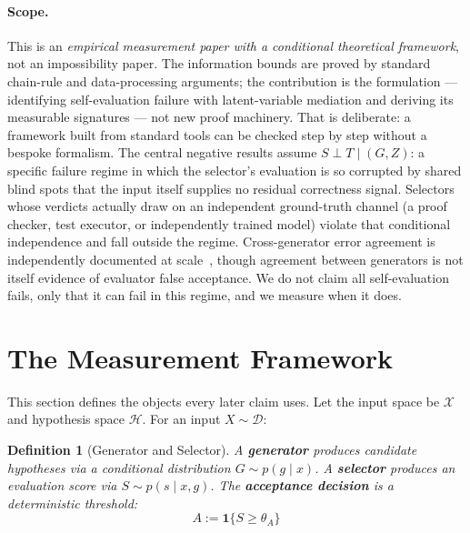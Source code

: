 \documentclass[a4paper,journal]{IAENGtran}
\newtheorem{Definition}[Theorem]{Definition}
\begin{document}
\paragraph{Scope.} This is an \emph{empirical measurement paper with a conditional
theoretical framework}, not an impossibility paper. The information bounds are
proved by standard chain-rule and data-processing arguments; the contribution is
the formulation — identifying self-evaluation failure with latent-variable
mediation and deriving its measurable signatures — not new proof machinery. That
is deliberate: a framework built from standard tools can be checked step by step
without a bespoke formalism. The central negative results assume $S\perp T\mid(G,Z)$: a specific failure regime in which the selector's evaluation
is so corrupted by shared blind spots that the input itself supplies no residual
correctness signal. Selectors whose verdicts actually draw on an independent ground-truth
channel (a proof checker,
test executor, or independently trained model) violate that conditional independence
and fall outside the regime. Cross-generator
error agreement is independently documented at scale~\cite{kim2025correlated}, though
agreement between generators is not itself evidence of evaluator false acceptance. We do
not claim all self-evaluation fails, only that it can fail in this regime, and we measure
when it does.

\section{The Measurement Framework}
\label{sec:formalization}

This section defines the objects every later claim uses. Let the input space be
$\mathcal{X}$ and hypothesis space $\mathcal{H}$. For an input $X\sim\mathcal{D}$:

\begin{Definition}[Generator and Selector]
A \textbf{generator} produces candidate hypotheses via a conditional distribution
$G \sim p(g \mid x)$. A \textbf{selector} produces an evaluation score via
$S \sim p(s \mid x, g)$. The \textbf{acceptance decision} is a deterministic threshold:
\begin{equation}
A := \mathbf{1}\{S \geq \theta_A\}
\end{equation}
\end{Definition}
\end{document}

